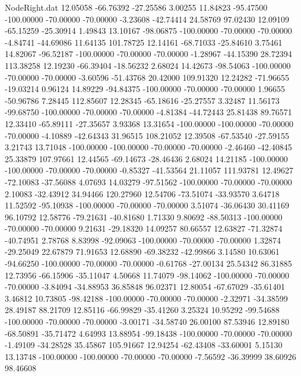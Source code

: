 \begin{filecontents}{NodeRight.dat}
  12.05058  -66.76392  -27.25586     3.00255   11.84823  -95.47500 -100.00000  -70.00000  -70.00000   -3.23608  -42.74414   24.58769   97.02430
  12.09109  -65.15259  -25.30914     1.49843   13.10167  -98.06875 -100.00000  -70.00000  -70.00000   -4.84741  -44.69086   11.64135  101.78725
  12.14161  -68.71033  -25.84610     3.75461   14.82067  -96.52187 -100.00000  -70.00000  -70.00000   -1.28967  -44.15390   28.72394  113.38258
  12.19230  -66.39404  -18.56232     2.68024   14.42673  -98.54063 -100.00000  -70.00000  -70.00000   -3.60596  -51.43768   20.42000  109.91320
  12.24282  -71.96655  -19.03214     0.96124   14.89229  -94.84375 -100.00000  -70.00000  -70.00000    1.96655  -50.96786    7.28445  112.85607
  12.28345  -65.18616  -25.27557     3.32487   11.56173  -99.68750 -100.00000  -70.00000  -70.00000   -4.81384  -44.72443   25.81438   89.76571
  12.33410  -65.89111  -27.35657     3.93368   13.31654 -100.00000 -100.00000  -70.00000  -70.00000   -4.10889  -42.64343   31.96515  108.21052
  12.39508  -67.53540  -27.59155     3.21743   13.71048 -100.00000 -100.00000  -70.00000  -70.00000   -2.46460  -42.40845   25.33879  107.97661
  12.44565  -69.14673  -28.46436     2.68024   14.21185 -100.00000 -100.00000  -70.00000  -70.00000   -0.85327  -41.53564   21.11057  111.93781
  12.49627  -72.10083  -37.56088     4.07693   14.03279  -97.51562 -100.00000  -70.00000  -70.00000    2.10083  -32.43912   34.94466  120.27960
  12.54706  -73.51074  -33.93570     3.64718   11.52592  -95.10938 -100.00000  -70.00000  -70.00000    3.51074  -36.06430   30.41169   96.10792
  12.58776  -79.21631  -40.81680     1.71330    9.80692  -88.50313 -100.00000  -70.00000  -70.00000    9.21631  -29.18320   14.09257   80.66557
  12.63827  -71.32874  -40.74951     2.78768    8.83998  -92.09063 -100.00000  -70.00000  -70.00000    1.32874  -29.25049   22.67879   71.91653
  12.68890  -69.38232  -42.99866     3.14580   10.63061  -94.66250 -100.00000  -70.00000  -70.00000   -0.61768  -27.00134   25.54342   86.31885
  12.73956  -66.15906  -35.11047     4.50668   11.74079  -98.14062 -100.00000  -70.00000  -70.00000   -3.84094  -34.88953   36.85848   96.02371
  12.80054  -67.67029  -35.61401     3.46812   10.73805  -98.42188 -100.00000  -70.00000  -70.00000   -2.32971  -34.38599   28.49187   88.21709
  12.85116  -66.99829  -35.41260     3.25324   10.95292  -99.54688 -100.00000  -70.00000  -70.00000   -3.00171  -34.58740   26.00100   87.53946
  12.89180  -68.50891  -35.71472     4.64993   13.88954  -99.18438 -100.00000  -70.00000  -70.00000   -1.49109  -34.28528   35.45867  105.91667
  12.94254  -62.43408  -33.60001     5.15130   13.13748 -100.00000 -100.00000  -70.00000  -70.00000   -7.56592  -36.39999   38.60926   98.46608

\end{filecontents}
